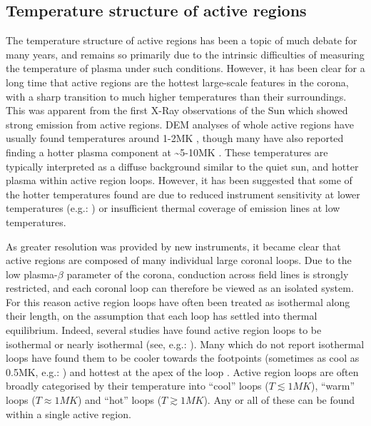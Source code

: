 \documentclass[namedreferences]{solarphysics}
\begin{document}
\begin{article}
\subsection{Temperature structure of active regions}
The temperature structure of active regions has been a topic of much debate for many years, and remains so primarily due to the intrinsic difficulties of measuring the temperature of plasma under such conditions.
However, it has been clear for a long time that active regions are the hottest large-scale features in the corona, with a sharp transition to much higher temperatures than their surroundings.
This was apparent from the first X-Ray observations of the Sun which showed strong emission from active regions.
DEM analyses of whole active regions have usually found temperatures around 1-2MK \citep{Brosius1996,Kashyap1998,Schmelz2009,Reale2009,Warren2009a,Goryaev2010}, though many have also reported finding a hotter plasma component at \textasciitilde{}5-10MK \citep{Brosius1996,Kashyap1998,Schmelz2009,Reale2009}.
These temperatures are typically interpreted as a diffuse background similar to the quiet sun, and hotter plasma within active region loops.
However, it has been suggested that some of the hotter temperatures found are due to reduced instrument sensitivity at lower temperatures (e.g.: \citet{Boerner2013}) or insufficient thermal coverage of emission lines at low temperatures.

As greater resolution was provided by new instruments, it became clear that active regions are composed of many individual large coronal loops.
Due to the low plasma-$\beta$ parameter of the corona, conduction across field lines is strongly restricted, and each coronal loop can therefore be viewed as an isolated system.
For this reason active region loops have often been treated as isothermal along their length, on the assumption that each loop has settled into thermal equilibrium.
Indeed, several studies have found active region loops to be isothermal or nearly isothermal (see, e.g.: \citet{Lenz1999,DelZanna2011,DelZanna2013}).
Many which do not report isothermal loops have found them to be cooler towards the footpoints (sometimes as cool as 0.5MK, e.g.: \citet{DelZanna2011}) and hottest at the apex of the loop \citep{Cheng1980,Aschwanden2000,DelZanna2003}.
Active region loops are often broadly categorised by their temperature into ``cool'' loops ($T\lesssim1MK$), ``warm'' loops ($T\approx1MK$) and ``hot'' loops ($T\gtrsim1MK$).
Any or all of these can be found within a single active region.


\end{article}
\end{document}
